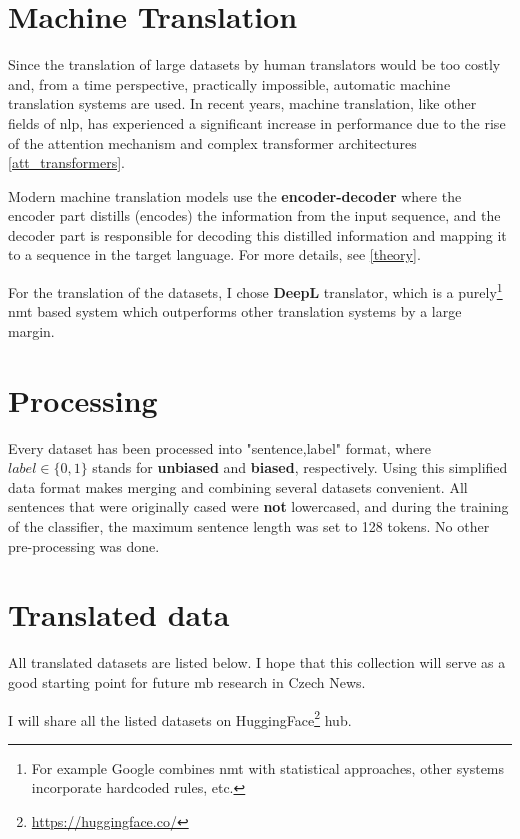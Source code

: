  
 
 
 
\section{Machine Translation}\label{DeepL}
Since the translation of large datasets by human translators would be too costly and, from a time perspective, practically impossible, automatic machine translation systems are used. In recent years, machine translation, like other fields of \Gls{nlp}, has experienced a significant increase in performance due to the rise of the attention mechanism and complex transformer architectures \ref{att_transformers}.

Modern machine translation models use the \textbf{encoder-decoder} where the encoder part distills (encodes) the information from the input sequence, and the decoder part is responsible for decoding this distilled information and mapping it to a sequence in the target language. For more details, see \ref{theory}.

For the translation of the datasets, I chose \textbf{DeepL} translator, which is a purely\footnote{For example Google combines \Gls{nmt} with statistical approaches, other systems incorporate hardcoded rules, etc.} \Gls{nmt} based system which outperforms other translation systems by a large margin.






\section{Processing}\label{processing}
Every dataset has been processed into "sentence,label" format, where $label \in \{0,1\}$ stands for \textbf{unbiased} and \textbf{biased}, respectively. Using this simplified data format makes merging and combining several datasets convenient. All sentences that were originally cased were \textbf{not} lowercased, and during the training of the classifier, the maximum sentence length was set to 128 tokens. No other pre-processing was done.

\section{Translated data}
All translated datasets are listed below. I hope that this collection will serve as a good starting point for future \gls{mb} research in Czech News.

I will share all the listed datasets on HuggingFace\footnote{\url{https://huggingface.co/}} hub.

